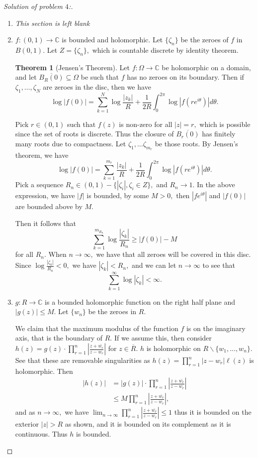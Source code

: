 \documentclass[letterpaper,11pt,twoside]{article}
\theoremstyle{proposition}
\theoremstyle{definition}
\theoremstyle{theorem}
\newtheorem{theorem}{Theorem}[section]
\theoremstyle{definition}
\theoremstyle{definition}
\theoremstyle{definition}
\theoremstyle{lemma}
\theoremstyle{definition}
\theoremstyle{definition}
\theoremstyle{corollary}
\theoremstyle{definition}
\theoremstyle{definition}
\theoremstyle{definition}
\newcommand{\abs}[1]{\left \vert #1 \right \vert}
\begin{document}
	\begin{proof}[Solution of problem $4$:]
	\begin{enumerate}
		\item \textit{This section is left blank}
		\item $f:(0,1) \to \mathbb{C} $ is bounded and holomorphic. Let $\{\zeta_n\}$ be the zeroes of $f$ in $ B(0,1).$ Let $Z= \{\zeta_n\},$ which is 
		countable discrete by identity theorem. 
		
		\begin{theorem}[Jensen's Theorem]
			Let $f: \Omega \to \mathbb{C}$ be holomorphic on a domain, and let $\overline{B_R(0)} \subseteq \Omega $ be such that $f$ has no zeroes on its 
			boundary. Then if $\zeta_1, \dots ,\zeta_N$ are zeroes in the disc, then we have $$ \log \abs{f(0)} = \sum_{k=1}^{N}\log \frac{\abs{z_k}}{R} + 
			\frac{1}{2R} \int_{0}^{2\pi} \log \abs{f(re^{i\theta})}d\theta.$$ 
		\end{theorem}
	Pick $r \in (0,1)$ such that $f(z)$ is non-zero for all $\abs{z}=r,$ which is possible since the set of roots is discrete. Thus the closure of 
	$\overline{B_r(0)}$ has finitely many roots due to compactness. Let $\zeta_1, \dots \zeta_{m_r}$ be those roots. By Jensen's theorem, we have 
	$$ \log \abs{f(0)} = \sum_{k=1}^{m_r} \frac{\abs{z_k}}{R} + 
	\frac{1}{2R} \int_{0}^{2\pi} \log \abs{f(re^{i\theta})}d\theta.$$ Pick a sequence $R_n \in (0,1)- \{\abs{\zeta_i}, \zeta_i \in Z\},$ and $R_n \to 1.$ 
	In the above expression, we have $\abs{f}$ is bounded, by some $M>0,$ then $\abs{fe^{i\theta}}$ and $\abs{f(0)}$ are bounded above by $M.$ 
	
	Then it follows that $$ \sum_{k=1}^{m_{R_n}} \log \frac{\abs{\zeta_k}}{R_n} \geq \abs{f(0)} - M $$ for all $R_n.$ When $n \to \infty,$ we have that all 
	zeroes will be covered in this disc.  Since $\log \frac{\abs{\zeta_k}}{R_n} <0,$ we have $\abs{\zeta_k} < R_n,$ and we can let $n \to \infty$ to see 
	that $$ \sum_{k=1}^{\infty} \log \abs{\zeta_k} < \infty. $$  
	
	\item $g: R \to \mathbb{C}$ is a bounded holomorphic function on the right half plane and $\abs{g(z)} \leq M.$ Let $\{w_n\}$ be the zeroes in $R.$ 
	
	We claim that the maximum modulus of the function $f$ is on the imaginary axis, that is the boundary of $R.$ If we assume this, then consider $h(z)=g(z) 
	\cdot \prod_{r=1}^{n} \abs{\frac{z+\overline{w_r}}{z- w_r}}$ for $z \in \overline{R}.$ $h$ is holomorphic on $R \backslash \{w_1, \dots, w_n\}.$ See 
	that these are removable singularities as $h(z)= \prod_{r=1}^{n} \abs{z- w_r} \ell(z)$ is holomorphic. Then 
	\begin{align*}
		\abs{h(z)} & = \abs{g(z)} \cdot \prod_{r=1}^{n} \abs{\frac{z+\overline{w_r}}{z- w_r}} \\
		& \leq M \prod_{r=1}^{n} \abs{\frac{z+\overline{w_r}}{z- w_r}},
	\end{align*}  
and as $n \to \infty,$ we have $ \lim_{n \to \infty} \prod_{r=1}^{n} \abs{\frac{z+\overline{w_r}}{z- w_r}} \leq 1 $  thus it is bounded on the exterior 
$\abs{z} > R$ as shown, and it is bounded on its complement as it is continuous. Thus $h$ is bounded. 


\end{enumerate}
\end{proof}
\end{document}

